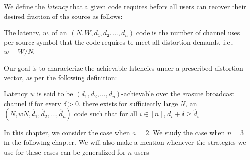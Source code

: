 We define the {\it latency} that a given code requires before all users can recover their desired fraction of the source as follows:
\begin{mydef}
	The latency, $w$, of an~$(N, W, d_{1}, d_{2}, \ldots, d_{n})$ code is the number of channel uses per source symbol that the code requires to meet all distortion demands, i.e., $w = W/N$.
\end{mydef}
%
Our goal is to characterize the achievable latencies under a prescribed distortion vector,
as per the following definition:
\begin{mydef}
\label{def:achievable_general_feedback}
	Latency $w$ is said to be $(d_{1}, d_{2}, \ldots,  d_{n})$-achievable over the erasure broadcast channel if for every $\delta > 0$, there exists for sufficiently large $N$, an $(N, wN, \hat{d}_{1}, \hat{d}_{2}, \ldots, \hat{d}_{n})$ code such that for all $i \in [n]$, $d_{i}+\delta \geq \hat{d}_{i}$.
	
	

\end{mydef}

In this chapter, we consider the case when $n=2$.  We study the case when $n=3$ in the following chapter.  We will also make a mention whenever the strategies we use for these cases can be generalized for $n$ users.  

%


